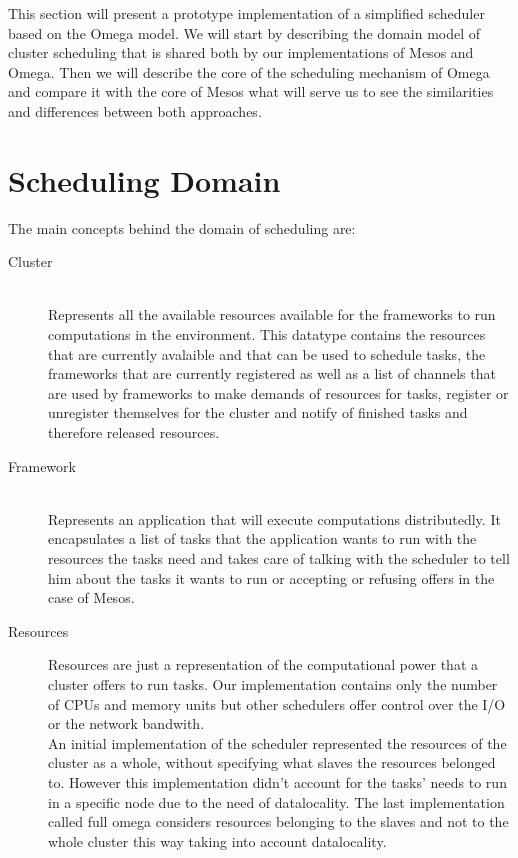 \documentclass{report}                     %
\begin{document}
This section will present a prototype implementation of a simplified
scheduler based on the Omega model. We will start by describing the
domain model of cluster scheduling that is shared both by our
implementations of Mesos and Omega. Then we will describe the core of
the scheduling mechanism of Omega and compare it with the core of
Mesos what will serve us to see the similarities and differences
between both approaches.

\section{Scheduling Domain}

The main concepts behind the domain of scheduling are:

\begin{description}
  \item[Cluster] \hfill \\
  Represents all the available resources available for the frameworks
  to run computations in the environment. This datatype contains the
  resources that are currently avalaible and that can be used to
  schedule tasks, the frameworks that are currently registered as well
  as a list of channels that are used by frameworks to make demands of
  resources for tasks, register or unregister themselves for the
  cluster and notify of finished tasks and therefore released resources.
  \item[Framework] \hfill \\
  Represents an application that will execute computations
  distributedly. It encapsulates a list of tasks that the application
  wants to run with the resources the tasks need and takes care of
  talking with the scheduler to tell him about the tasks it wants to
  run or accepting or refusing offers in the case of Mesos.
  \item[Resources]
  Resources are just a representation of the computational power that
  a cluster offers to run tasks. Our implementation contains only the
  number of CPUs and memory units but other schedulers offer control
  over the I/O or the network bandwith. \\

  An initial implementation of the scheduler represented the resources
  of the cluster as a whole, without specifying what slaves the
  resources belonged to. However this implementation didn't account
  for the tasks' needs to run in a specific node due to the need of
  datalocality. The last implementation called full omega considers
  resources belonging to the slaves and not to the whole cluster this
  way taking into account datalocality.
  

\end{description}
\end{document}
